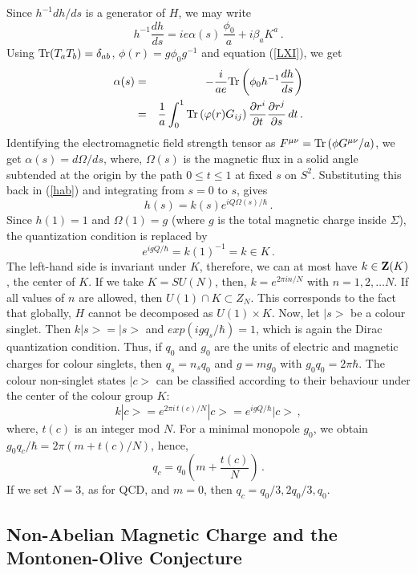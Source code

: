 Since $h^{-1} dh/ds$ is a generator of $H$, we may write
\begin{equation}
h^{-1} \frac{dh}{ds}=ie\alpha (s)\,\frac{\phi_0}{a} +
i \beta_{a} K^{a} \,.
\label{hab}
\end{equation}
Using ${\rm Tr}(T_a T_b)=\delta_{ab}$, $\phi(r)=g\phi_0 g^{-1}$ and
equation (\ref{LXI}), we get 
\begin{eqnarray}
\alpha (s)&=&-\frac{i}{ae}{\rm Tr}\left(\phi_0 h^{-1}\frac{dh}{ds} 
\right) \nonumber \\
&=&\frac{1}{a} \int^{1}_{0}{\rm Tr} \left(\varphi (r) G_{ij}\right) 
\frac{\partial r^i}{\partial t}\frac{\partial r^j}{\partial s}\,dt\,.
\nonumber
\end{eqnarray}
Identifying  the electromagnetic field strength tensor as
$F^{\mu\nu}={\rm Tr}\,(\phi G^{\mu\nu}/a)$, we get $\alpha(s)=
d\Omega/ds$, where, $\Omega(s)$ is the magnetic flux in a solid angle
subtended at the origin by the path $0\leq t\leq 1$ at fixed $s$ on
$S^2$. Substituting this back in (\ref{hab}) and integrating from
$s=0$  to $s$, gives
$$
h(s)= k(s) e^{i Q \Omega(s) / \hbar}\,.
$$
Since $h(1)=1$ and $\Omega (1) = g$ (where $g$ is the total magnetic
charge inside $\Sigma$), the quantization condition is replaced by 
$$
e^{igQ/\hbar} = k(1)^{-1}=k \in K \,.
$$
The left-hand side is invariant under $K$, therefore, we can at most
have $k\in {\bf Z}(K)$, the center of $K$. If we take $K = SU(N)$,
then, $k=e^{2\pi in/N}$ with $n=1,2,\dots N$. If all values of $n$ are
allowed, then $U(1)\cap K\subset Z_{N}$. This corresponds to the fact
that globally, $H$ cannot be decomposed as $U(1)\times K$. Now, let 
$|s>$ be a colour singlet. Then $k|s> = |s>$ and $exp(igq_s/\hbar)=1$,
which is again the Dirac quantization condition. Thus, if $q_0$ and
$g_0$ are the units of electric and magnetic charges for colour
singlets, then $q_s=n_sq_0$ and $g=mg_0$ with $g_0q_0=2\pi\hbar$. 
The colour non-singlet states $|c>$ can be classified according to
their behaviour under the center of the colour group $K$:
$$
k|c> = e^{2\pi i \, t(c)/N} |c> =e^{igQ / \hbar} |c>\,,
$$
where, $t(c)$ is an integer mod $N$. For a minimal monopole $g_{0}$,
we obtain $g_0 q_c /\hbar=2\pi(m + t(c)/N) $, hence,
$$
q_c = q_0 (m + \frac{t(c)}{N})\,. 
$$
If we set $N=3$, as for QCD, and $m=0$, then $q_c=q_0/3, 2q_0/3,q_0$. 

\subsection{Non-Abelian Magnetic Charge and the Montonen-Olive
  Conjecture} 


